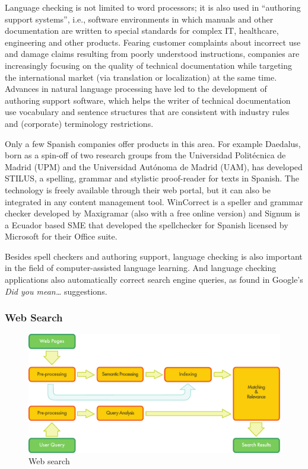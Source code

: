 \begin{multicols}{2}
Language checking is not limited to word processors; it is also used in “authoring support systems”, i.e., software environments in which manuals and other documentation are written to special standards for complex IT, healthcare, engineering and other products. Fearing customer complaints about incorrect use and damage claims resulting from poorly understood instructions, companies are increasingly focusing on the quality of technical documentation while targeting the international market (via translation or localization) at the same time. Advances in natural language processing have led to the development of authoring support software, which helps the writer of technical documentation use vocabulary and sentence structures that are consistent with industry rules and (corporate) terminology restrictions.

Only a few Spanish companies offer products in this area. For example Daedalus, born as a spin-off of two research groups from the Universidad Politécnica de Madrid (UPM) and the Universidad Autónoma de Madrid (UAM), has developed STILUS, a spelling, grammar and stylistic proof-reader for texts in Spanish. The technology is freely available through their web portal, but it can also be integrated in any content management tool. WinCorrect is a speller and grammar checker developed by Maxigramar (also with a free online version) and Signum is a Ecuador based SME that developed the spellchecker for Spanish licensed by Microsoft for their Office suite.

Besides spell checkers and authoring support, language checking is also important in the field of computer-assisted language learning. And language checking applications also automatically correct search engine queries, as found in Google's \textit{Did you mean\ldots} suggestions.

\subsubsection{Web Search}

\begin{figure}[htb]
  \center
  \includegraphics[width=\textwidth]{../_media/english/web_search_architecture}
  \caption{Web search}
  \label{fig:websearcharch_en}
 \end{figure}


\end{multicols}
